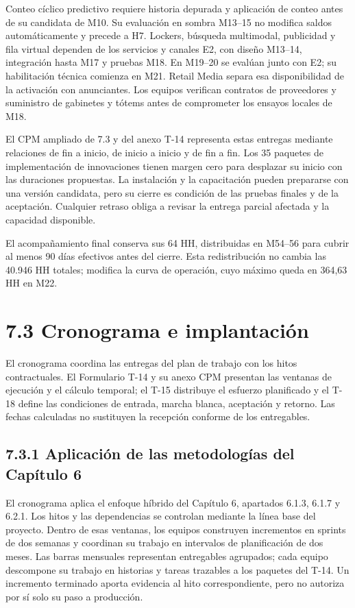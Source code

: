 \documentclass[11pt]{article}
\begin{document}
Conteo cíclico predictivo requiere historia depurada y aplicación de conteo antes de su candidata de M10. Su evaluación en sombra M13–15 no modifica saldos automáticamente y precede a H7. Lockers, búsqueda multimodal, publicidad y fila virtual dependen de los servicios y canales E2, con diseño M13–14, integración hasta M17 y pruebas M18. En M19–20 se evalúan junto con E2; su habilitación técnica comienza en M21. Retail Media separa esa disponibilidad de la activación con anunciantes. Los equipos verifican contratos de proveedores y suministro de gabinetes y tótems antes de comprometer los ensayos locales de M18.

El CPM ampliado de 7.3 y del anexo T-14 representa estas entregas mediante relaciones de fin a inicio, de inicio a inicio y de fin a fin. Los 35 paquetes de implementación de innovaciones tienen margen cero para desplazar su inicio con las duraciones propuestas. La instalación y la capacitación pueden prepararse con una versión candidata, pero su cierre es condición de las pruebas finales y de la aceptación. Cualquier retraso obliga a revisar la entrega parcial afectada y la capacidad disponible.

El acompañamiento final conserva sus 64 HH, distribuidas en M54–56 para cubrir al menos 90 días efectivos antes del cierre. Esta redistribución no cambia las 40.946 HH totales; modifica la curva de operación, cuyo máximo queda en 364,63 HH en M22.


\section{7.3 Cronograma e implantación}\label{cronograma-e-implantaciuxf3n}

El cronograma coordina las entregas del plan de trabajo con los hitos contractuales. El Formulario T-14 y su anexo CPM presentan las ventanas de ejecución y el cálculo temporal; el T-15 distribuye el esfuerzo planificado y el T-18 define las condiciones de entrada, marcha blanca, aceptación y retorno. Las fechas calculadas no sustituyen la recepción conforme de los entregables.

\subsection{7.3.1 Aplicación de las metodologías del Capítulo 6}

El cronograma aplica el enfoque híbrido del Capítulo 6, apartados 6.1.3, 6.1.7 y 6.2.1. Los hitos y las dependencias se controlan mediante la línea base del proyecto. Dentro de esas ventanas, los equipos construyen incrementos en sprints de dos semanas y coordinan su trabajo en intervalos de planificación de dos meses. Las barras mensuales representan entregables agrupados; cada equipo descompone su trabajo en historias y tareas trazables a los paquetes del T-14. Un incremento terminado aporta evidencia al hito correspondiente, pero no autoriza por sí solo su paso a producción.
\end{document}
